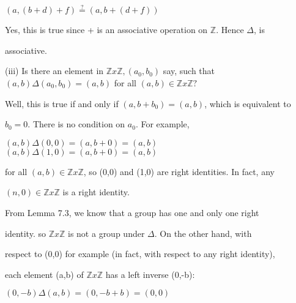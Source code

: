 \documentclass[11pt]{amsbook}
\begin{document}

\begin{center}

    $(a,(b+d)+f)\stackrel{?}{=}(a,b+(d+f))$

\end{center}

Yes, this is true since + is an associative operation on $\mathbb{Z}$. Hence $\Delta$, is\par
associative.

\begin{center}

    (iii) Is there an element in $\mathbb{Z}x\mathbb{Z},(a_{0},b_{0})$ say, such that\\
    $(a,b)\Delta(a_{0},b_{0})=(a,b)$ for all $(a,b)\in \mathbb{Z}x\mathbb{Z}? $

\end{center}

Well, this is true if and only if $(a,b+b_{0})=(a,b)$, which is equivalent to\par
$b_{0}=0$. There is no condition on $a_{0}$. For example,\\

\begin{center}

    $(a,b)\Delta(0,0)=(a,b+0)=(a,b)$\\
    $(a,b)\Delta(1,0)=(a,b+0)=(a,b)$

\end{center}

for all $(a,b)\in\mathbb{Z}x\mathbb{Z}$, so (0,0) and (1,0) are right identities. In fact, any\par
$(n,0)\in\mathbb{Z}x\mathbb{Z}$ is a right identity.\par
From Lemma 7.3, we know that a group has one and only one right\par
identity. so $\mathbb{Z}x\mathbb{Z}$ is not a group under $\Delta$. On the other hand, with\par
respect to (0,0) for example (in fact, with respect to any right identity),\par
each element (a,b) of $\mathbb{Z}x\mathbb{Z}$ has a left inverse (0,-b):

\begin{center}

    $(0,-b)\Delta(a,b)=(0,-b+b)=(0,0)$

\end{center}
\end{document}
